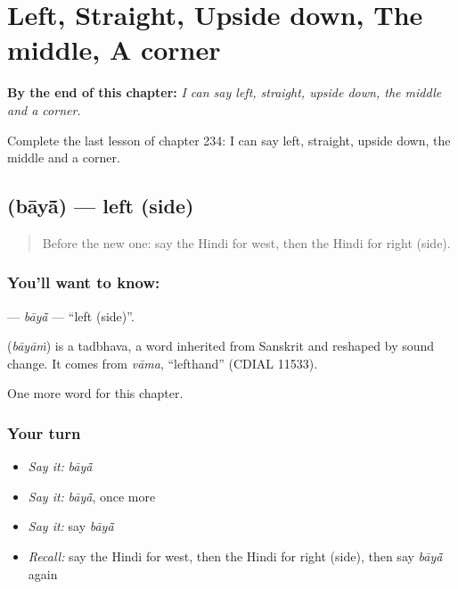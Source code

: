 
\chapter{Left, Straight, Upside down, The middle, A corner}
\label{ch:hi-left-straight-upside-down-the-middle-a-corner}

\begin{chapteropening}
\textbf{By the end of this chapter:} \emph{I can say left, straight, upside down, the middle and a corner.}

Complete the last lesson of chapter 234: I can say left, straight, upside down, the middle and a corner.
\end{chapteropening}

\section[\texorpdfstring{\hi{बायाँ} (bāyā̃)}{बायाँ (bāyā̃)}]{ (bāyā̃) — left (side)}

\label{lesson:HI-C234-baya}



\begin{quote}
Before the new one: say the Hindi for west, then the Hindi for right (side).
\end{quote}

\subsection*{You'll want to know: }
\textbf{} — \emph{bāyā̃} — \textquotedblleft{}left (side)\textquotedblright{}.

\begin{cousinweb}
\textbf{} (\emph{bāyāṁ}) is a tadbhava, a word inherited from Sanskrit and reshaped by sound change. It comes from \emph{vāma}, \textquotedblleft{}lefthand\textquotedblright{} (CDIAL 11533).
\end{cousinweb}

\begin{grammarlens}[title={What you've built}]
One more word for this chapter.
\end{grammarlens}

\subsection*{Your turn}
\begin{itemize}
\raggedright
  \item \emph{Say it:} \emph{bāyā̃}
  \item \emph{Say it:} \emph{bāyā̃}, once more
  \item \emph{Say it:} say \emph{bāyā̃}
  \item \emph{Recall:} say the Hindi for west, then the Hindi for right (side), then say \emph{bāyā̃} again
\end{itemize}

